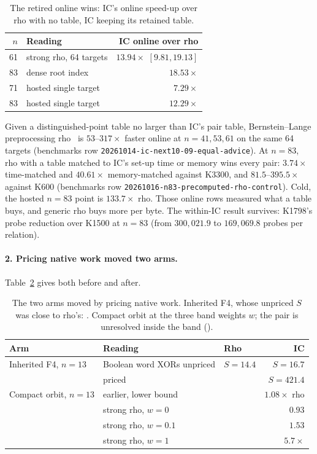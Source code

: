 \begin{table}[t]
\centering\small
\begin{tabular}{@{}rlr@{}}
\toprule
$n$ & Reading & IC online over rho \\
\midrule
61 & strong rho, 64 targets & $13.94\times$ $[9.81,19.13]$ \\
83 & dense root index & $18.53\times$ \\
71 & hosted single target & $7.29\times$ \\
83 & hosted single target & $12.29\times$ \\
\bottomrule
\end{tabular}
\caption[]{The retired online wins: IC's online speed-up over rho with no
table, IC keeping its retained table.}
\label{tab:audit-online}
\end{table}
Given a distinguished-point table no larger than IC's pair table,
Bernstein--Lange preprocessing rho~\cite{bl2012} is $53$--$317\times$ faster
online at $n=41,53,61$ on the same 64 targets (benchmarks row
\texttt{20261014-ic-next10-09-equal-advice}). At $n=83$, rho with a table
matched to IC's set-up time or memory wins every pair: $3.74\times$
time-matched and $40.61\times$ memory-matched against K3300, and
$81.5$--$395.5\times$ against K600 (benchmarks row
\texttt{20261016-n83-precomputed-rho-control}). Cold, the hosted $n=83$
point is $133.7\times$ rho. Those online rows measured what a table buys,
and generic rho buys more per byte. The within-IC result survives: K1798's
probe reduction over K1500 at $n=83$ (from $300{,}021.9$ to $169{,}069.8$
probes per relation).

\paragraph{2. Pricing native work moved two arms.} Table~\ref{tab:audit-pricing}
gives both before and after.

\begin{table}[t]
\centering\small
\begin{tabular}{@{}lllr@{}}
\toprule
Arm & Reading & Rho & IC \\
\midrule
Inherited F4, $n=13$ & Boolean word XORs unpriced & $S=14.4$ & $S=16.7$ \\
 & priced & & $S=421.4$ \\
\addlinespace
Compact orbit, $n=13$ & earlier, lower bound & & $1.08\times$ rho \\
 & strong rho, $w=0$ & & $0.93$ \\
 & strong rho, $w=0.1$ & & $1.53$ \\
 & strong rho, $w=1$ & & $5.7\times$ \\
\bottomrule
\end{tabular}
\caption[]{The two arms moved by pricing native work. Inherited F4, whose unpriced $S$ was close to rho's:
. Compact orbit at the
three band weights $w$; the pair is unresolved inside the band
().}
\label{tab:audit-pricing}
\end{table}

